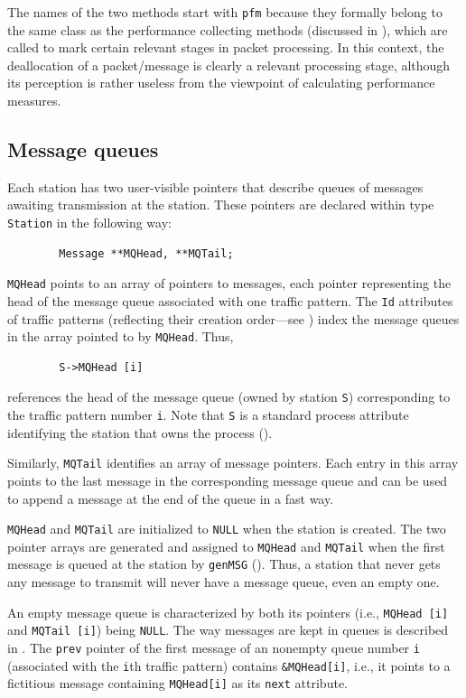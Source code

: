 The names of the two methods start with {\tt pfm} because they formally
belong to the same class as the performance collecting methods (discussed
in ), which are called to mark certain relevant stages in
packet processing.
In this context, the deallocation of a packet/message is clearly a relevant
processing stage, although its perception is rather useless from the
viewpoint of calculating performance measures.

\subsection{Message queues}
\label{rm_cl_mq}

Each station has two user-visible
pointers that describe queues of messages awaiting
transmission at the station.
These pointers are declared within type {\tt Station} in the following way:
\begin{verbatim}
        Message **MQHead, **MQTail;
\end{verbatim}

\noindent
{\tt MQHead} points to an array of pointers to messages, each pointer
representing the head of the message queue associated with one
traffic pattern.
The {\tt Id} attributes of traffic patterns (reflecting their creation
order---see ) index the message queues in the array
pointed to by {\tt MQHead}.
Thus,
\begin{verbatim}
        S->MQHead [i]
\end{verbatim}
references the head of the message queue (owned by station {\tt S})
corresponding to the traffic pattern number {\tt i}.
Note that {\tt S} is a standard process attribute identifying the station
that owns the process ().

Similarly, {\tt MQTail} identifies an array of message pointers.
Each entry
in this array points to the last message in the corresponding message queue
and can be used to append a message at the end of the queue in a fast way.

{\tt MQHead} and {\tt MQTail} are initialized to {\tt NULL} when the station
is created.
The two pointer arrays are generated and assigned to {\tt MQHead} and
{\tt MQTail} when
the first message is queued at the station by {\tt genMSG}
().
Thus, a station that never gets any message to transmit will never
have a message queue, even an empty one.

An empty message queue is characterized by both its pointers (i.e.,
{\tt MQHead~[i]} and {\tt MQTail~[i]}) being {\tt NULL}.
The way messages are kept in queues is described in .
The {\tt prev} pointer of the first message of an nonempty queue number
{\tt i} (associated with the {\tt i}th traffic pattern) contains
{\tt \&MQHead[i]}, i.e., it points to a fictitious message containing
{\tt MQHead[i]} as its {\tt next} attribute.

